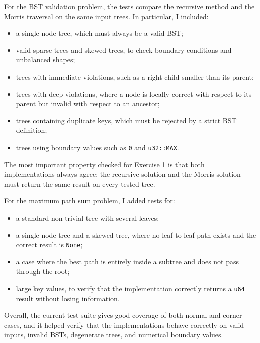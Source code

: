 \documentclass[11pt,a4paper]{article}
\begin{document}
For the BST validation problem, the tests compare the recursive method and the Morris traversal on the same input trees. In particular, I included:
\begin{itemize}
    \item a single-node tree, which must always be a valid BST;
    \item valid sparse trees and skewed trees, to check boundary conditions and unbalanced shapes;
    \item trees with immediate violations, such as a right child smaller than its parent;
    \item trees with deep violations, where a node is locally correct with respect to its parent but invalid with respect to an ancestor;
    \item trees containing duplicate keys, which must be rejected by a strict BST definition;
    \item trees using boundary values such as \texttt{0} and \texttt{u32::MAX}.
\end{itemize}

The most important property checked for Exercise 1 is that both implementations always agree: the recursive solution and the Morris solution must return the same result on every tested tree.

For the maximum path sum problem, I added tests for:
\begin{itemize}
    \item a standard non-trivial tree with several leaves;
    \item a single-node tree and a skewed tree, where no leaf-to-leaf path exists and the correct result is \texttt{None};
    \item a case where the best path is entirely inside a subtree and does not pass through the root;
    \item large key values, to verify that the implementation correctly returns a \texttt{u64} result without losing information.
\end{itemize}

Overall, the current test suite gives good coverage of both normal and corner cases, and it helped verify that the implementations behave correctly on valid inputs, invalid BSTs, degenerate trees, and numerical boundary values.
\end{document}

